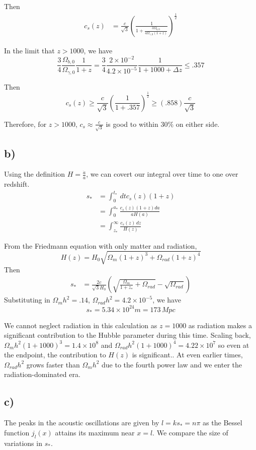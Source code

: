 \documentclass{article}
\begin{document}
Then
\begin{align*}
c_s(z) &= \frac{c}{\sqrt{3}}\left(\frac{1}{1+\frac{3\Omega_{b,0}}{4\Omega_{\gamma,0}(1+z)}}\right)^{\frac{1}{2}}
\end{align*}

In the limit that $z>1000$, we have 
\[\frac{3}{4}\frac{\Omega_{b,0}}{\Omega_{\gamma,0}}\frac{1}{1+z}=\frac{3}{4}\frac{2\times 10^{-2}}{4.2\times 10^{-5}}\frac{1}{1+1000+\Delta z}\leq .357\]

Then 
\[c_s(z) \geq \frac{c}{\sqrt{3}}\left(\frac{1}{1+.357}\right)^{\frac{1}{2}}\geq (.858)\frac{c}{\sqrt{3}}\]

Therefore, for $z>1000$, $c_s\approx \frac{c}{\sqrt{3}}$ is good to within $30\%$ on either side.
\subsection*{b)}
Using the definition $H=\frac{\dot{a}}{a}$, we can covert our integral over time to one over redshift. 
\begin{align*}
s_*&=\int_0^{t_*}\,dt c_s(z)(1+z)\\
&= \int_0^{a_*} \frac{c_s(z)(1+z)da}{aH(a)}\\
&= \int_{z_*}^\infty \frac{c_s(z)\,dz}{H(z)}
\end{align*}

From the Friedmann equation with only matter and radiation,
\[H(z) = H_0\sqrt{\Omega_m (1+z)^3+\Omega_{rad}(1+z)^4}\]
Then
\begin{align*}
s_* &= \frac{2c}{\sqrt{3}H_0}\left(\sqrt{\frac{\Omega_m}{1+z_*}+\Omega_{rad}}-\sqrt{\Omega_{rad}}\right)
\end{align*}
Substituting in $\Omega_mh^2 = .14$, $\Omega_{rad}h^2 = 4.2\times 10^{-5}$, we have
\[s_* = 5.34\times 10^{24}m=173\,Mpc\]

We cannot neglect radiation in this calculation as $z=1000$ as radiation makes a significant contribution to the Hubble parameter during this time. Scaling back, $\Omega_mh^2(1+1000)^3 = 1.4\times 10^8$ and $\Omega_{rad}h^2(1+1000)^4= 4.22\times 10^7$ so even at the endpoint, the contribution to $H(z)$ is significant.. At even earlier times, $\Omega_{rad}h^2$ grows faster than $\Omega_mh^2$ due to the fourth power law and we enter the radiation-dominated era.
\subsection*{c)}
The peaks in the acoustic oscillations are given by $l=ks_*=n\pi$ as the Bessel function $j_l(x)$ attains its maximum near $x=l$. We compare the size of variations in $s_*$.
\end{document}
